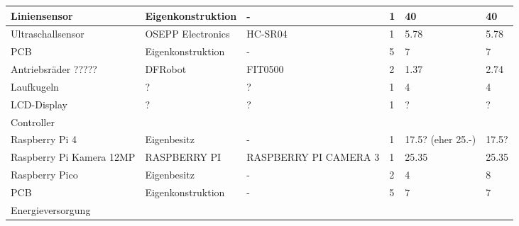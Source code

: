 \documentclass[main.tex]{subfiles} %
\begin{document}
\begin{table}[h]
\begin{tabular}{|p{3cm}|p{3cm}|p{3cm}|p{1cm}|p{1.5cm}|p{1cm}|}
        Liniensensor                           & Eigenkonstruktion   & -                       & 1               & 40                        & 40                          \\ \hline
        Ultraschallsensor                      & OSEPP Electronics   & HC-SR04                 & 1               & 5.78                      & 5.78                        \\ \hline
        PCB                                    & Eigenkonstruktion   & -                       & 5               & 7                         & 7                           \\ \hline
        Antriebsräder ?????                    & DFRobot             & FIT0500                 & 2               & 1.37                      & 2.74                           \\ \hline
        Laufkugeln                             & ?                   & ?                       & 1               & 4                         & 4                           \\ \hline
        LCD-Display                            & ?                   & ?                       & 1               & ?                         & ?                           \\ \hline
        \rowcolor{lightgray} Controller        &                     &                         &                 &                           &                             \\ \hline
        Raspberry Pi 4                         & Eigenbesitz         & -                       & 1               & 17.5? (eher 25.-)         & 17.5?                       \\ \hline
        Raspberry Pi Kamera 12MP               & RASPBERRY PI        & RASPBERRY PI CAMERA 3   & 1               & 25.35                     & 25.35                       \\ \hline
        Raspberry Pico                         & Eigenbesitz         & -                       & 2               & 4                         & 8                           \\ \hline
        PCB                                    & Eigenkonstruktion   & -                       & 5               & 7                         & 7                           \\ \hline
        \rowcolor{lightgray} Energieversorgung &                     &                         &                 &                           &                             \\ \hline

\end{tabular}
\end{table}
\end{document}
